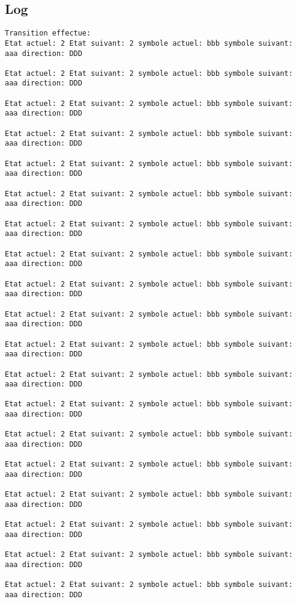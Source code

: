 \documentclass{article}
\begin{document}
\subsection{Log}
\begin{verbatim}
Transition effectue:
Etat actuel: 2 Etat suivant: 2 symbole actuel: bbb symbole suivant: aaa direction: DDD

Etat actuel: 2 Etat suivant: 2 symbole actuel: bbb symbole suivant: aaa direction: DDD

Etat actuel: 2 Etat suivant: 2 symbole actuel: bbb symbole suivant: aaa direction: DDD

Etat actuel: 2 Etat suivant: 2 symbole actuel: bbb symbole suivant: aaa direction: DDD

Etat actuel: 2 Etat suivant: 2 symbole actuel: bbb symbole suivant: aaa direction: DDD

Etat actuel: 2 Etat suivant: 2 symbole actuel: bbb symbole suivant: aaa direction: DDD

Etat actuel: 2 Etat suivant: 2 symbole actuel: bbb symbole suivant: aaa direction: DDD

Etat actuel: 2 Etat suivant: 2 symbole actuel: bbb symbole suivant: aaa direction: DDD

Etat actuel: 2 Etat suivant: 2 symbole actuel: bbb symbole suivant: aaa direction: DDD

Etat actuel: 2 Etat suivant: 2 symbole actuel: bbb symbole suivant: aaa direction: DDD

Etat actuel: 2 Etat suivant: 2 symbole actuel: bbb symbole suivant: aaa direction: DDD

Etat actuel: 2 Etat suivant: 2 symbole actuel: bbb symbole suivant: aaa direction: DDD

Etat actuel: 2 Etat suivant: 2 symbole actuel: bbb symbole suivant: aaa direction: DDD

Etat actuel: 2 Etat suivant: 2 symbole actuel: bbb symbole suivant: aaa direction: DDD

Etat actuel: 2 Etat suivant: 2 symbole actuel: bbb symbole suivant: aaa direction: DDD

Etat actuel: 2 Etat suivant: 2 symbole actuel: bbb symbole suivant: aaa direction: DDD

Etat actuel: 2 Etat suivant: 2 symbole actuel: bbb symbole suivant: aaa direction: DDD

Etat actuel: 2 Etat suivant: 2 symbole actuel: bbb symbole suivant: aaa direction: DDD

Etat actuel: 2 Etat suivant: 2 symbole actuel: bbb symbole suivant: aaa direction: DDD


\end{verbatim}
\end{document}
